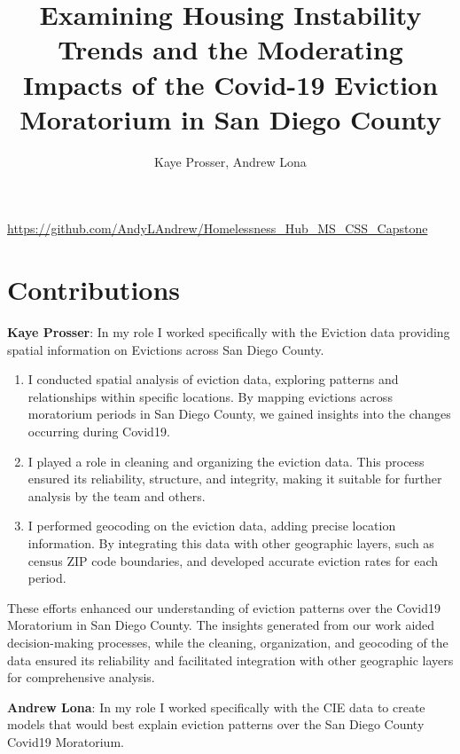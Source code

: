 \documentclass[man, 12pt, donotrepeattitle, floatsintext]{apa7} %
\title{Examining Housing Instability Trends and the Moderating Impacts of the Covid-19 Eviction Moratorium in San Diego County}
\author{Kaye Prosser, Andrew Lona}
\affiliation{{University of California, San Diego}}
\begin{document}
\maketitle %
\tableofcontents %
\vspace{3.5in}
\url{https://github.com/AndyLAndrew/Homelessness_Hub_MS_CSS_Capstone}
\pagebreak %







\section{Contributions}

\textbf{Kaye Prosser}: In my role I worked specifically with the Eviction data providing spatial information on Evictions across San Diego County.  

\begin{enumerate}
    \item I conducted spatial analysis of eviction data, exploring patterns and relationships within specific locations. By mapping evictions across moratorium periods in San Diego County, we gained insights into the changes occurring during Covid19.
    \item I played a role in cleaning and organizing the eviction data. This process ensured its reliability, structure, and integrity, making it suitable for further analysis by the team and others. 
    \item I performed geocoding on the eviction data, adding precise location information. By integrating this data with other geographic layers, such as census ZIP code boundaries, and developed accurate eviction rates for each period.
\end{enumerate}

These efforts enhanced our understanding of eviction patterns over the Covid19 Moratorium in San Diego County. The insights generated from our work aided decision-making processes, while the cleaning, organization, and geocoding of the data ensured its reliability and facilitated integration with other geographic layers for comprehensive analysis.

\textbf{Andrew Lona}: In my role I worked specifically with the CIE data to create models that would best explain eviction patterns over the San Diego County Covid19 Moratorium.
\end{document}
